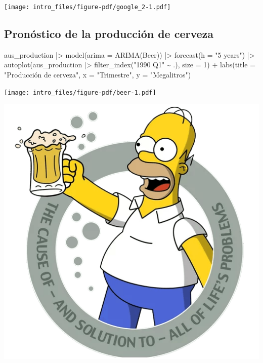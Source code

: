 \documentclass[
  letterpaper,
  DIV=11,
  numbers=noendperiod]{scrartcl}
\newenvironment{Shaded}{}{}
\newcommand{\AttributeTok}[1]{\textcolor[rgb]{0.65,0.15,0.64}{#1}}
\newcommand{\DecValTok}[1]{\textcolor[rgb]{0.60,0.41,0.00}{#1}}
\newcommand{\FunctionTok}[1]{\textcolor[rgb]{0.25,0.47,0.95}{#1}}
\newcommand{\NormalTok}[1]{\textcolor[rgb]{0.22,0.23,0.26}{#1}}
\newcommand{\SpecialCharTok}[1]{\textcolor[rgb]{0.00,0.52,0.74}{#1}}
\newcommand{\StringTok}[1]{\textcolor[rgb]{0.31,0.63,0.31}{#1}}
\begin{document}
\texttt{[image: intro\_files/figure-pdf/google\_2-1.pdf]}

\subsection{Pronóstico de la producción de
cerveza}\label{pronuxf3stico-de-la-producciuxf3n-de-cerveza}

\begin{Shaded}
\begin{Highlighting}[]
\NormalTok{aus\_production }\SpecialCharTok{|\textgreater{}} 
  \FunctionTok{model}\NormalTok{(}\AttributeTok{arima =} \FunctionTok{ARIMA}\NormalTok{(Beer)) }\SpecialCharTok{|\textgreater{}} 
  \FunctionTok{forecast}\NormalTok{(}\AttributeTok{h =} \StringTok{"5 years"}\NormalTok{) }\SpecialCharTok{|\textgreater{}} 
  \FunctionTok{autoplot}\NormalTok{(aus\_production }\SpecialCharTok{|\textgreater{}} \FunctionTok{filter\_index}\NormalTok{(}\StringTok{"1990 Q1"} \SpecialCharTok{\textasciitilde{}}\NormalTok{ .), }\AttributeTok{size =} \DecValTok{1}\NormalTok{) }\SpecialCharTok{+}
  \FunctionTok{labs}\NormalTok{(}\AttributeTok{title =} \StringTok{"Producción de cerveza"}\NormalTok{,}
       \AttributeTok{x =} \StringTok{"Trimestre"}\NormalTok{,}
       \AttributeTok{y =} \StringTok{"Megalitros"}\NormalTok{)}
\end{Highlighting}
\end{Shaded}

\texttt{[image: intro\_files/figure-pdf/beer-1.pdf]}

\includegraphics{homer.png}
\end{document}
